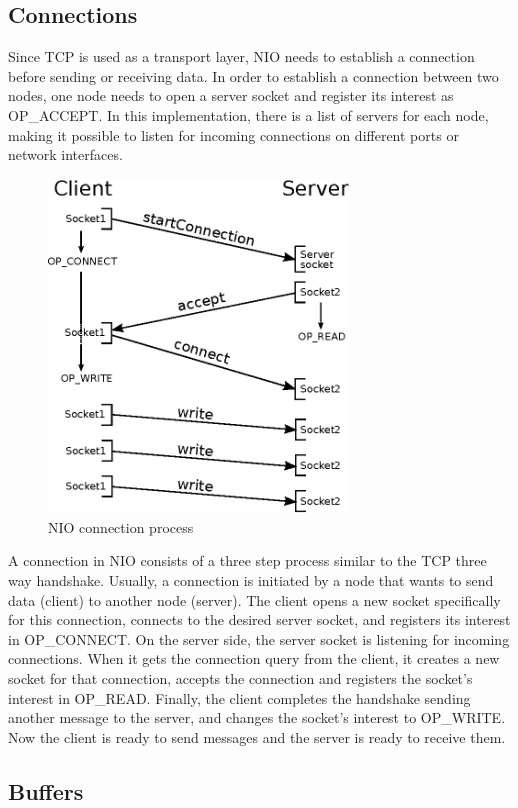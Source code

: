 \documentclass[11pt]{article}
\begin{document}
	\subsection{Connections}
	Since TCP is used as a transport layer, NIO needs to establish a connection before sending or receiving data. In order to establish a connection between two nodes, one node needs to open a server socket and register its interest as OP\_ACCEPT. In this implementation, there is a list of servers for each node, making it possible to listen for incoming connections on different ports or network interfaces.\\
	\begin{figure}[H]
	\centering
	\includegraphics[width=80mm]{img/drawing1.eps}
	\caption[NIO connection process]{NIO connection process}
	\label{drawing1}
	\end{figure}
	A connection in NIO consists of a three step process similar to the TCP three way handshake. Usually, a connection is initiated by a node that wants to send data (client) to another node (server). The client opens a new socket specifically for this connection, connects to the desired server socket, and registers its interest in OP\_CONNECT. On the server side, the server socket is listening for incoming connections. When it gets the connection query from the client, it creates a new socket for that connection, accepts the connection and registers the socket's interest in OP\_READ. Finally, the client completes the handshake sending another message to the server, and changes the socket's interest to OP\_WRITE. Now the client is ready to send messages and the server is ready to receive them.

\subsection{Buffers} 
	
\end{document}
